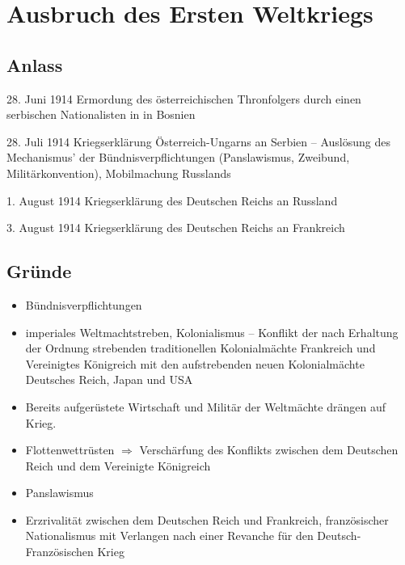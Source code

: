 \section{Ausbruch des Ersten Weltkriegs}

\subsection*{Anlass}

\begin{chronik}
\item[28. Juni 1914] Ermordung des österreichischen Thronfolgers
 durch einen serbischen Nationalisten in
 in Bosnien

\item[28. Juli 1914] Kriegserklärung Österreich-Ungarns an Serbien --
Auslösung des Mechanismus' der Bündnisverpflichtungen (Panslawismus,
Zweibund, Militärkonvention), Mobilmachung Russlands

\item[1. August 1914] Kriegserklärung des Deutschen Reichs an Russland

\item[3. August 1914] Kriegserklärung des Deutschen Reichs an Frankreich
\end{chronik}


\subsection*{Gründe}

\begin{itemize}
\item Bündnisverpflichtungen
\item imperiales Weltmachtstreben, Kolonialismus -- Konflikt der
nach Erhaltung der Ordnung strebenden traditionellen Kolonialmächte
Frankreich und Vereinigtes Königreich mit den aufstrebenden neuen
Kolonialmächte Deutsches Reich, Japan und USA

\item Bereits aufgerüstete Wirtschaft und Militär der Weltmächte
drängen auf Krieg.

\item Flottenwettrüsten $\Rightarrow$ Verschärfung des Konflikts
zwischen dem Deutschen Reich und dem Vereinigte Königreich

\item Panslawismus

\item Erzrivalität zwischen dem Deutschen Reich und Frankreich,
französischer Nationalismus mit Verlangen nach einer Revanche für den
Deutsch-Französischen Krieg
\end{itemize}
